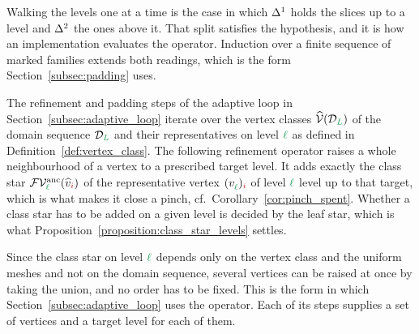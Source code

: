 \documentclass[a4paper, 12pt]{article}
\makeatletter
\newcommand{\green}{\color{ForestGreen}}
\newcommand{\brickred}{\color{BrickRed}}
\newcommand{\V}{\mathcal{V}}
\newcommand{\F}{\mathcal{F}}
\DeclareRobustCommand{\simplexsubsetTwo}[2][]{\Delta\ifx\@empty#1\@empty\else^{#1}\fi_{#2}}
\newcommand{\vertex}[2]{\freeQ{v}{}{#1}{#2}}
\newcommand{\vertexClass}[1]{\widehat{v}_{#1}}
\newcommand{\vertexClasses}{\widehat{\V}}
\newcommand{\coarseIdxone}{{\brickred i}}
\renewcommand{\l}{{\green\ell}}
\renewcommand{\L}{{\green L}}
\newcommand{\freeQ}[4]{ ( {#1}^{#2}_{#3} )_{#4}}
\theoremstyle{definition}
\theoremstyle{plain}
\numberwithin{equation}{section}
\DeclareRobustCommand{\domseq}[1][]{\mathcal{D}\ifx\@empty#1\@empty\else_{#1}\fi}
\newcommand{\FVanc}[1]{\F\V^{\mathrm{anc}}_{#1}}            %
\makeatother
\begin{document}
Walking the levels one at a time is the case in which $\simplexsubsetTwo[1]{}$ holds the slices up to a level and $\simplexsubsetTwo[2]{}$ the ones above it. That split satisfies the hypothesis, and it is how an implementation evaluates the operator. Induction over a finite sequence of marked families extends both readings, which is the form Section~\ref{subsec:padding} uses.

\smallskip

The refinement and padding steps of the adaptive loop in Section~\ref{subsec:adaptive_loop} iterate over the vertex classes $\vertexClasses(\domseq[\L])$ of the domain sequence $\domseq[\L]$ and their representatives on level $\l$ as defined in Definition~\ref{def:vertex_class}. The following refinement operator raises a whole neighbourhood of a vertex to a prescribed target level. It adds exactly the class star $\FVanc{\l}(\vertexClass{\coarseIdxone})$ of the representative vertex $\vertex{\l}{\coarseIdxone}$ of level $\l$ level up to that target, which is what makes it close a pinch, cf.\ Corollary~\ref{cor:pinch_spent}. Whether a class star has to be added on a given level is decided by the leaf star, which is what Proposition~\ref{proposition:class_star_levels} settles.

Since the class star on level $\l$ depends only on the vertex class and the uniform meshes and not on the domain sequence, several vertices can be raised at once by taking the union, and no order has to be fixed. This is the form in which Section~\ref{subsec:adaptive_loop} uses the operator. Each of its steps supplies a set of vertices and a target level for each of them.
\end{document}
